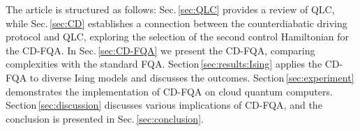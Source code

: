 \documentclass[twocolumn,aps,superscriptaddress,floatfix,longbibliography]{revtex4-2}
\newcommand{\Sec}[1]{Sec.\,\ref{#1}}
\newcommand{\SEC}[1]{Section\,\ref{#1}}
\begin{document}






The article is structured as follows:
\Sec{sec:QLC} %
provides a review of QLC, while 
\Sec{sec:CD} %
establishes a connection
between the counterdiabatic driving protocol and QLC, exploring
the selection of the second control Hamiltonian for the CD-FQA.
In \Sec{sec:CD-FQA} %
we present the CD-FQA, comparing complexities
with the standard FQA. \SEC{sec:results:Ising} %
applies the CD-FQA to diverse
Ising models and discusses the outcomes. 
\SEC{sec:experiment} %
demonstrates the implementation of CD-FQA on cloud quantum computers.
\SEC{sec:discussion} %
discusses various implications of CD-FQA, and the conclusion is presented
in \Sec{sec:conclusion}. %
\end{document}
